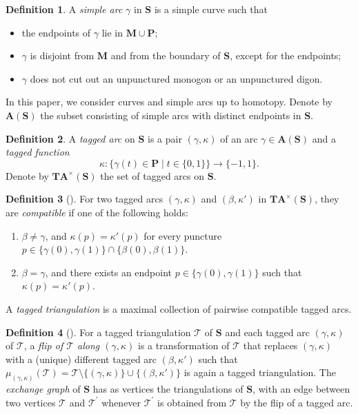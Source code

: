 \documentclass[11pt,a4paper,reqno]{amsart}%
\theoremstyle{plain}
\theoremstyle{definition}
\newtheorem{definition}[definition]{Definition}
\numberwithin{equation}{section}
\numberwithin{equation}{section}
\def\surf{\mathbf{S}} %
\def\surf{\mathbf{S}}                       %
\def\M{\mathbf{M}}
\def\A{\mathbf{A}}
\def\TA{\mathbf{T}\mathbf{A}}
\renewcommand\P{\mathbf{P}} %
\begin{document}
\begin{definition}
   A \emph{simple  arc} $ \gamma $ in $ \surf $ is a simple curve   such that  
	\begin{itemize}
	     \item the endpoints  of $\gamma  $ lie in $ \M\cup \P $;
        \item  $ \gamma $ is disjoint from $\M$ and from the boundary of $\surf$, except for the  endpoints;
        \item  $ \gamma $ does not cut out an unpunctured monogon or an unpunctured digon. 
	\end{itemize}
\end{definition}
In this paper, we consider curves and  simple arcs up to homotopy.
 Denote by  $\A(\surf) $ 
     the subset consisting of simple arcs with distinct endpoints in $\surf $.

\begin{definition} \label{tarc}
A \emph{tagged arc} on $\surf$ is a pair $(\gamma,\kappa)$ of an  arc $\gamma\in\A(\surf)$ and a \emph{tagged function} 
$$\kappa:\{\gamma(t)\in\P\mid  t\in \{0,1\}\}\to\{-1, 1\}.$$
Denote by $\TA^\times(\surf)$ the set of  tagged arcs on $\surf$.
\end{definition}

 

 \begin{definition}[{\cite[Definition~7.4]{FST}}]
    For two tagged arcs $(\gamma,\kappa)$  and $(\beta,\kappa')$ in  $\TA^\times(\surf)$, they are \emph{compatible} if one of the following holds:
\begin{enumerate}
    \item $\beta \neq \gamma$, and   $\kappa(p) = \kappa'(p)$ for every puncture $p \in \{\gamma(0), \gamma(1)\} \cap \{\beta(0), \beta(1)\}$.
    \item $\beta = \gamma$, and there exists an endpoint $p \in \{\gamma(0), \gamma(1)\}$ such that $\kappa(p) = \kappa'(p)$.
\end{enumerate} 
A \emph{tagged triangulation} is   a maximal collection of pairwise compatible tagged arcs. 
 \end{definition}

\begin{definition}[{\cite[Section~7]{FST}}]
 For a tagged triangulation $\mathcal{T}$ of $\surf$ and each tagged arc $(\gamma,\kappa)$ of $\mathcal{T}$, 
   a \emph{flip of $\mathcal{T}$    along $(\gamma,\kappa)$}  is a transformation of  $\mathcal{T}$  that  replaces  $(\gamma,\kappa)$ with  a (unique) different tagged arc $(\beta,\kappa')$ such that $\mu_{(\gamma,\kappa)}(\mathcal{T})=\mathcal{T}\setminus\{(\gamma,\kappa)\}\cup\{(\beta,\kappa')\} $ is again a tagged triangulation. The \emph{exchange graph} of $\surf$ has as vertices the triangulations of $\surf$, with an edge between two vertices $\mathcal{T}$ and $\mathcal{T}^{\prime}$ whenever $\mathcal{T}^{\prime}$ is obtained from $\mathcal{T}$ by the flip of a tagged arc.  
\end{definition}
  
\end{document}
